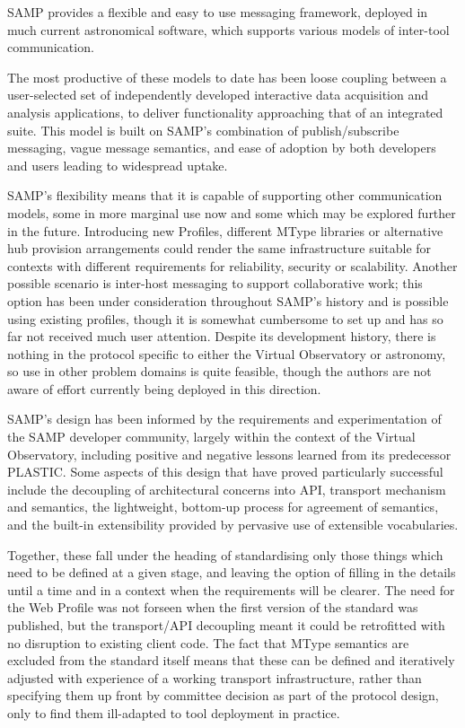 \documentclass[5p]{elsarticle}
\begin{document}
SAMP provides a flexible and easy to use messaging framework,
deployed in much current astronomical software,
which supports various models of inter-tool communication.

The most productive of these models to date has been loose coupling
between a user-selected set of independently developed
interactive data acquisition and analysis applications,
to deliver functionality approaching that of an
integrated suite.
This model is built on SAMP's combination of
publish/subscribe messaging,
vague message semantics,
and ease of adoption by both developers and users
leading to widespread uptake.

SAMP's flexibility means that it is capable of supporting other
communication models, some in more marginal use now
and some which may be explored further in the future.
Introducing new Profiles, different MType libraries or
alternative hub provision arrangements could render the same
infrastructure suitable for contexts with different
requirements for reliability, security or scalability.
Another possible scenario is inter-host messaging to
support collaborative work;
this option has been under consideration throughout SAMP's history
and is possible using existing profiles,
though it is somewhat cumbersome to set up and has so far not
received much user attention.
Despite its development history, there is nothing in the protocol
specific to either the Virtual Observatory or astronomy,
so use in other problem domains is quite feasible,
though the authors are not aware of effort currently being
deployed in this direction.

SAMP's design has been informed by the requirements and experimentation
of the SAMP developer community, largely within the context of
the Virtual Observatory,
including positive and negative lessons learned from its predecessor PLASTIC.
Some aspects of this design that have proved particularly successful
include
the decoupling of architectural concerns into API, transport
mechanism and semantics,
the lightweight, bottom-up process for agreement of semantics,
and the built-in extensibility provided by pervasive use of
extensible vocabularies.

Together, these fall under the heading of standardising
only those things which need to be defined at a given stage,
and leaving the option of filling in the details until a time
and in a context when the requirements will be clearer.
The need for the Web Profile was not forseen when the first version
of the standard was published, but the transport/API decoupling
meant it could be retrofitted with no disruption to existing client code.
The fact that MType semantics are excluded from the standard
itself means that these can be defined and iteratively adjusted with
experience of a working transport infrastructure, rather than
specifying them up front by committee decision as part of the
protocol design, only to find them ill-adapted to tool
deployment in practice.
\end{document}
